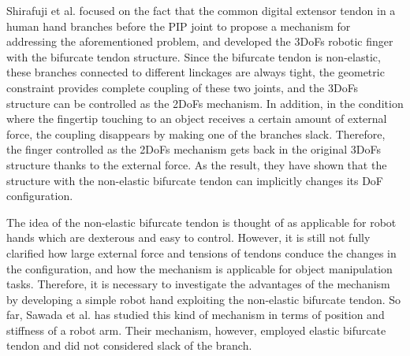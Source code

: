 \documentclass{llncs}
\begin{document}
Shirafuji et al. focused on the fact that the common digital extensor
tendon in a human hand branches before the PIP joint to propose a
mechanism for addressing the aforementioned problem, and developed the
3DoFs robotic finger with the bifurcate tendon
structure\cite{Shirafuji2014b}.
Since the bifurcate tendon is non-elastic, these branches connected to
different linckages are always tight, the geometric constraint provides
complete coupling of these two joints, and the 3DoFs structure can be
controlled as the 2DoFs mechanism.
In addition, in the condition where the fingertip touching to an object
receives a certain amount of external force, the coupling disappears by
making one of the branches slack.
Therefore, the finger controlled as the 2DoFs mechanism gets back in the
original 3DoFs structure thanks to the external force.
As the result, they have shown that the structure with the non-elastic
bifurcate tendon can implicitly changes its DoF configuration.

The idea of the non-elastic bifurcate tendon is thought of as applicable
for robot hands which are dexterous and easy to control.
However, it is still not fully clarified how large external force and
tensions of tendons conduce the changes in the configuration, and how
the mechanism is applicable for object manipulation tasks.
Therefore, it is necessary to investigate the advantages of the
mechanism by developing a simple robot hand exploiting the non-elastic
bifurcate tendon.
So far, Sawada et al. has studied this kind of mechanism in terms of
position and stiffness of a robot arm.
Their mechanism, however, employed elastic bifurcate tendon and did not
considered slack of the branch.
\end{document}
